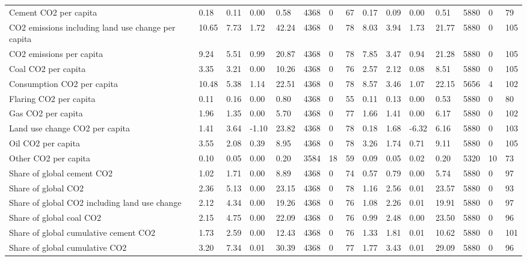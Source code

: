 \begin{longtable}{lllllllllllllll}
\addlinespace
Cement CO2 per capita & 0.18 & 0.11 & 0.00 & 0.58 & 4368 & 0 & 67 & 0.17 & 0.09 & 0.00 & 0.51 & 5880 & 0 & 79\\
CO2 emissions including land use change per capita & 10.65 & 7.73 & 1.72 & 42.24 & 4368 & 0 & 78 & 8.03 & 3.94 & 1.73 & 21.77 & 5880 & 0 & 105\\
CO2 emissions per capita & 9.24 & 5.51 & 0.99 & 20.87 & 4368 & 0 & 78 & 7.85 & 3.47 & 0.94 & 21.28 & 5880 & 0 & 105\\
Coal CO2 per capita & 3.35 & 3.21 & 0.00 & 10.26 & 4368 & 0 & 76 & 2.57 & 2.12 & 0.08 & 8.51 & 5880 & 0 & 105\\
Consumption CO2 per capita & 10.48 & 5.38 & 1.14 & 22.51 & 4368 & 0 & 78 & 8.57 & 3.46 & 1.07 & 22.15 & 5656 & 4 & 102\\
\addlinespace
Flaring CO2 per capita & 0.11 & 0.16 & 0.00 & 0.80 & 4368 & 0 & 55 & 0.11 & 0.13 & 0.00 & 0.53 & 5880 & 0 & 80\\
Gas CO2 per capita & 1.96 & 1.35 & 0.00 & 5.70 & 4368 & 0 & 77 & 1.66 & 1.41 & 0.00 & 6.17 & 5880 & 0 & 102\\
Land use change CO2 per capita & 1.41 & 3.64 & -1.10 & 23.82 & 4368 & 0 & 78 & 0.18 & 1.68 & -6.32 & 6.16 & 5880 & 0 & 103\\
Oil CO2 per capita & 3.55 & 2.08 & 0.39 & 8.95 & 4368 & 0 & 78 & 3.26 & 1.74 & 0.71 & 9.11 & 5880 & 0 & 105\\
Other CO2 per capita & 0.10 & 0.05 & 0.00 & 0.20 & 3584 & 18 & 59 & 0.09 & 0.05 & 0.02 & 0.20 & 5320 & 10 & 73\\
\addlinespace
Share of global cement CO2 & 1.02 & 1.71 & 0.00 & 8.89 & 4368 & 0 & 74 & 0.57 & 0.79 & 0.00 & 5.74 & 5880 & 0 & 97\\
Share of global CO2 & 2.36 & 5.13 & 0.00 & 23.15 & 4368 & 0 & 78 & 1.16 & 2.56 & 0.01 & 23.57 & 5880 & 0 & 93\\
Share of global CO2 including land use change & 2.12 & 4.34 & 0.00 & 19.26 & 4368 & 0 & 76 & 1.08 & 2.26 & 0.01 & 19.91 & 5880 & 0 & 97\\
Share of global coal CO2 & 2.15 & 4.75 & 0.00 & 22.09 & 4368 & 0 & 76 & 0.99 & 2.48 & 0.00 & 23.50 & 5880 & 0 & 96\\
Share of global cumulative cement CO2 & 1.73 & 2.59 & 0.00 & 12.43 & 4368 & 0 & 76 & 1.33 & 1.81 & 0.01 & 10.62 & 5880 & 0 & 101\\
\addlinespace
Share of global cumulative CO2 & 3.20 & 7.34 & 0.01 & 30.39 & 4368 & 0 & 77 & 1.77 & 3.43 & 0.01 & 29.09 & 5880 & 0 & 96\\

\end{longtable}
